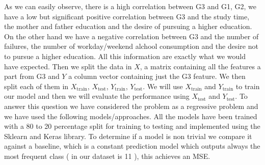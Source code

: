 \documentclass[a4paper, 11pt]{report}
\theoremstyle{definition}
\numberwithin{equation}{section}		%
\numberwithin{table}{section}				%
\begin{document}
As we can easily observe, there is a high correlation between G3 and G1, G2, we have a low but significant positive correlation between G3 and the study time, the mother and father education and the desire of pursuing a higher education. On the other hand we have a negative correlation between G3 and the number of failures, the number of workday/weekend alchool consumption and the desire not to pursue a higher education. All this information are exactly what we would have expected. Then we split the data in $X$, a matrix containing all the features a part from G3 and $Y$ a column vector containing just the G3 feature. We then split each of them in $X_{\text{train}}$, $X_{\text{test}}$, $Y_{\text{train}}$, $Y_{\text{test}}$. We will use $X_{\text{train}}$ and $Y_{\text{train}}$ to train our model and then we will evaluate the performance using $X_{\text{test}}$ and $Y_{\text{test}}$. To answer this question we have considered the problem as a regressive problem and we have used the following models/approaches. All the models have been trained with a 80 to 20 percentage split for training to testing and implemented using the Sklearn and Keras library. To determine if a model is non trivial we compare it against a baseline, which is a constant prediction model which outputs always the most frequent class ( in our dataset is 11 ), this achieves an MSE.
\end{document}
